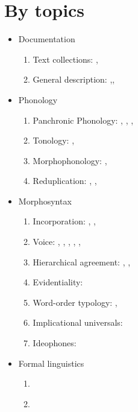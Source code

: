 \documentclass[oldfontcommands,oneside,a4paper,11pt]{article}
\begin{document}
\section{By topics}
\begin{itemize}

\item Documentation
\begin{enumerate}
\item  Text collections: \citet{jacques10gesar}, 
\item General description: \citet{jacques04these},\citet{jacques08},
\end{enumerate}


\item Phonology
\begin{enumerate}
\item  Panchronic Phonology:  \citet{jacques11lingua}, \citet{michaud-jacques12nasalite},     \citet{jacques13arapaho}, 
\item   Tonology: \citet{jacques11pumi.tone},
\item Morphophonology: \citet{jacques12khaling},   
\item Reduplication:  \citet{jacques04redupl},  \citet{jacques07redupl},
\end{enumerate}

\item Morphosyntax
\begin{enumerate}
\item  Incorporation: \citet{jacques11tangut.verb}, \citet{jacques12incorp}, 
\item  Voice:  \citet{jacques07passif}, \citet{jacques10refl}, \citet{jacques12demotion}, \citet{jacques13derivational.khaling}, \citet{jacques13tropative}, \citet{jacques14antipassive}
\item Hierarchical agreement:  \citet{jacques10inverse},     \citet{jacques12khaling},   \citet{antonov14rtau}
\item Evidentiality: \citet{jacques14auditory}
\item Word-order typology: \citet{jacques13harmonization}, 
\item Implicational universals: \citet{antonov14need}
\item Ideophones: \citet{japhug14ideophones}
\end{enumerate}

\item Formal linguistics
\begin{enumerate}
\item \citet{walther14inv.canon}
\item \citet{walther14compactness}
\end{enumerate}


\end{itemize}
\end{document}
